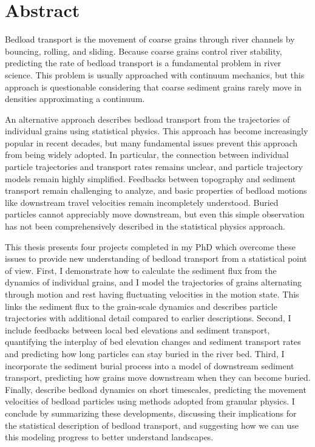 
\chapter{Abstract}

Bedload transport is the movement of coarse grains through river channels by bouncing, rolling, and sliding.
Because coarse grains control river stability, predicting the rate of bedload transport is a fundamental problem in river science.
This problem is usually approached with continuum mechanics, but this approach is questionable considering that coarse sediment grains rarely move in densities approximating a continuum.

An alternative approach describes bedload transport from the trajectories of individual grains using statistical physics.
This approach has become increasingly popular in recent decades, but many fundamental issues prevent this approach from being widely adopted.
In particular, the connection between individual particle trajectories and transport rates remains unclear, and particle trajectory models remain highly simplified.
Feedbacks between topography and sediment transport remain challenging to analyze, and basic properties of bedload motions like downstream travel velocities remain incompletely understood.
Buried particles cannot appreciably move downstream, but even this simple observation has not been comprehensively described in the statistical physics approach.

This thesis presents four projects completed in my PhD which overcome these issues to provide new understanding of bedload transport from a statistical point of view.
First, I demonstrate how to calculate the sediment flux from the dynamics of individual grains, and I model the trajectories of grains alternating through motion and rest having fluctuating velocities in the motion state.
This links the sediment flux to the grain-scale dynamics and describes particle trajectories with additional detail compared to earlier descriptions.
Second, I include feedbacks between local bed elevations and sediment transport, quantifying the interplay of bed elevation changes and sediment transport rates and predicting how long particles can stay buried in the river bed.
Third, I incorporate the sediment burial process into a model of downstream sediment transport, predicting how grains move downstream when they can become buried.
Finally, describe bedload dynamics on short timescales, predicting the movement velocities of bedload particles using methods adopted from granular physics.
I conclude by summarizing these developments, discussing their implications for the statistical description of bedload transport, and suggesting how we can use this modeling progress to better understand landscapes.

